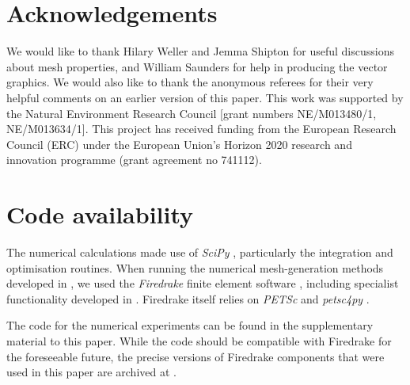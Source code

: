 \documentclass[11pt, a4paper]{scrartcl}  %
\theoremstyle{plain}
\theoremstyle{definition}
\numberwithin{equation}{section}
\begin{document}
\section*{Acknowledgements}
We would like to thank Hilary Weller and Jemma Shipton for useful
discussions about mesh properties, and William Saunders for help in
producing the vector graphics. We would also like to thank the anonymous
referees for their very helpful comments on an earlier version of this
paper. This work was supported by the Natural Environment Research
Council [grant numbers NE/M013480/1, NE/M013634/1]. This project has
received funding from the European Research Council (ERC) under the
European Union's Horizon 2020 research and innovation programme (grant
agreement no 741112).

\appendix

\section{Code availability}

The numerical calculations made use of \emph{SciPy} \citep{scipy-cite},
particularly the integration and optimisation routines. When running the
numerical mesh-generation methods developed in \citet{mcrae2018optimal},
we used the \emph{Firedrake} finite element software
\citep{rathgeber2016firedrake}, including specialist functionality
developed in \citet{rognes2013automating,alnaes2014unified,
mcrae2016automated,homolya2016parallel,luporini2017algorithm,
homolya2018tsfc,homolya2017exposing}. Firedrake itself relies on
\emph{PETSc} \citep{petsc-user-ref,petsc-efficient} and \emph{petsc4py}
\citep{dalcin2011parallel}.

The code for the numerical experiments can be found in the supplementary
material to this paper. While the code should be compatible with
Firedrake for the foreseeable future, the precise versions of Firedrake
components that were used in this paper are archived at
\citet{zenodo_firedrake}.


\end{document}
